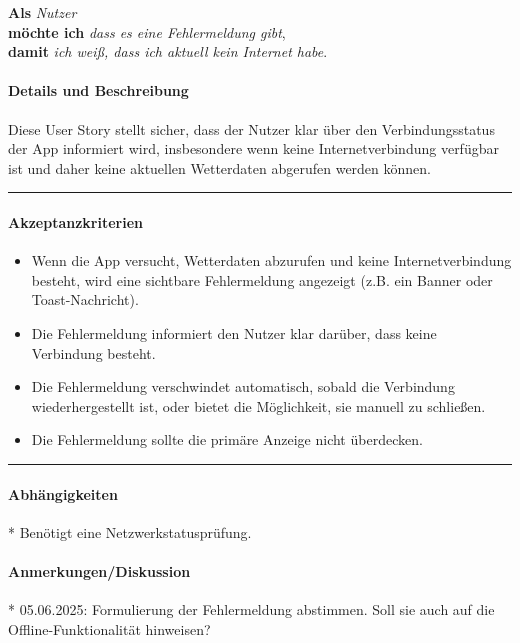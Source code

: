 \documentclass{article}
\begin{document}
\vspace{0.5em}

\textcolor{storygreen}{\textbf{Als}} \textit{Nutzer} \\
\textcolor{storygreen}{\textbf{möchte ich}} \textit{dass es eine Fehlermeldung gibt}, \\
\textcolor{storygreen}{\textbf{damit}} \textit{ich weiß, dass ich aktuell kein Internet habe}.

\vspace{1em}

\paragraph{Details und Beschreibung}
Diese User Story stellt sicher, dass der Nutzer klar über den Verbindungsstatus der App informiert wird, insbesondere wenn keine Internetverbindung verfügbar ist und daher keine aktuellen Wetterdaten abgerufen werden können.

\vspace{0.5em}
\hrule

\paragraph{Akzeptanzkriterien}
\begin{itemize}
    \item Wenn die App versucht, Wetterdaten abzurufen und keine Internetverbindung besteht, wird eine sichtbare Fehlermeldung angezeigt (z.B. ein Banner oder Toast-Nachricht).
    \item Die Fehlermeldung informiert den Nutzer klar darüber, dass keine Verbindung besteht.
    \item Die Fehlermeldung verschwindet automatisch, sobald die Verbindung wiederhergestellt ist, oder bietet die Möglichkeit, sie manuell zu schließen.
    \item Die Fehlermeldung sollte die primäre Anzeige nicht überdecken.
\end{itemize}

\vspace{0.5em}
\hrule

\paragraph{Abhängigkeiten}
* Benötigt eine Netzwerkstatusprüfung.

\paragraph{Anmerkungen/Diskussion}
* 05.06.2025: Formulierung der Fehlermeldung abstimmen. Soll sie auch auf die Offline-Funktionalität hinweisen?
\end{document}
